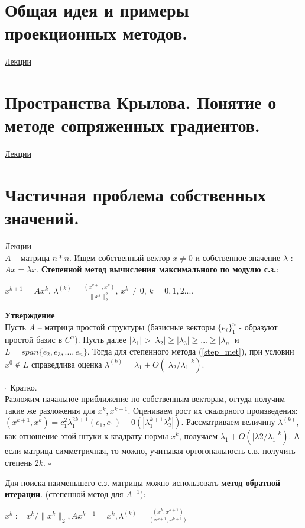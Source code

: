 \documentclass[specialist, subf, href, colorlinks=true, 12pt, times, mtpro, final]{disser}
\theoremstyle{definition}
\begin{document}
\section {Общая идея и примеры проекционных методов.}
	\hyperlink {lects.74}{Лекции}\\

\section {Пространства Крылова. Понятие о методе сопряженных градиентов.}
	\hyperlink {lects.74}{Лекции}\\

\section {Частичная проблема собственных значений.}
	\hyperlink {lects.78}{Лекции}\\
	$A$ \--- матрица $n*n$. Ищем собственный вектор $x \ne 0$ и собственное значение $\lambda$ : $Ax = \lambda x$.
	\textbf{Степенной метод вычисления максимального по модулю с.з.}:\\
	\begin{center}
	\label{step_met}
	$x^{k+1} = Ax^k$,  $\lambda^{(k)} = \frac{(x^{k+1}, x^k)}{\|x^k\|^2_2}$, $x^k \ne 0$,  $k=0,1,2...$.
	\end{center}
	\textbf{Утверждение}\\
	Пусть $A$ \--- матрица простой структуры (базисные векторы $\{e_i\}^n_1$ - образуют простой базис в $C^n$). Пусть далее $|\lambda_1| > |\lambda_2| \geq |\lambda_3| \geq ... \geq |\lambda_n|$ и $L=span\{e_2,e_3,...,e_n\}$. Тогда для степенного метода (\ref{step_met}), при условии $x^0 \notin L$ справедлива оценка $\lambda^{(k)} = \lambda_1 + O(|\lambda_2/\lambda_1|^k)$.
	
	$\square$ Кратко.\\
	Разложим начальное приближение по собственным векторам, оттуда получим такие же разложения для $x^k, x^{k+1}$. Оцениваем рост их скалярного произведения: $(x^{k+1}, x^k) = c^2_1 \lambda^{2k+1}_1 (e_1, e_1) + 0(|\lambda^{k+1}_1\lambda^k_2|)$.
	Рассматриваем величину $\lambda^{(k)}$, как отношение этой штуки к квадрату нормы $x^k$,  получаем $\lambda_1 + O(|\lambda2/\lambda_1|^k)$. А если матрица симметричная, то можно, учитывая ортогональность с.в. получить степень $2k$. 
	$\square$
	
	
	Для поиска наименьшего с.з. матрицы можно использовать \textbf{метод обратной итерации}. (степенной метод для $A^{-1}$):\\
	\begin{center}
	$x^k := x^k / \|x^k\|_2, Ax^{k+1} = x^k, \lambda^{(k)} = \frac{(x^k, x^{k+1})}{(x^{k+1}, x^{k+1})}$
	\end{center}
	
\end{document}

